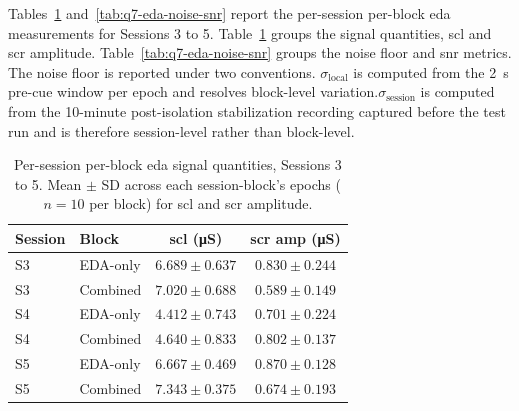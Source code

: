 Tables~\ref{tab:q7-eda-signal} and~\ref{tab:q7-eda-noise-snr} report the per-session per-block \gls{eda} measurements for Sessions 3 to 5. Table~\ref{tab:q7-eda-signal} groups the signal quantities, \gls{scl} and \gls{scr} amplitude. Table~\ref{tab:q7-eda-noise-snr} groups the noise floor and \gls{snr} metrics. The noise floor is reported under two conventions. $\sigma_{\text{local}}$ is computed from the \SI{2}{\second} pre-cue window per epoch and resolves block-level variation.$\sigma_{\text{session}}$ is computed from the 10-minute post-isolation stabilization recording captured before the test run and is therefore session-level rather than block-level.
\begin{table}[!htbp]
  \centering
  \caption{Per-session per-block \gls{eda} signal quantities, Sessions 3 to 5. Mean $\pm$ SD across each session-block's epochs ($n = \num{10}$ per block) for \gls{scl} and \gls{scr} amplitude.}
  \label{tab:q7-eda-signal}
  \begin{tabular}{l l c c}
    \toprule
    \textbf{Session} & \textbf{Block} & \textbf{\gls{scl} (\si{\micro\siemens})} & \textbf{\gls{scr} amp (\si{\micro\siemens})} \\
    \midrule
    S3 & EDA-only & $\num{6.689} \pm \num{0.637}$ & $\num{0.830} \pm \num{0.244}$ \\
    S3 & Combined & $\num{7.020} \pm \num{0.688}$ & $\num{0.589} \pm \num{0.149}$ \\
    \addlinespace
    S4 & EDA-only & $\num{4.412} \pm \num{0.743}$ & $\num{0.701} \pm \num{0.224}$ \\
    S4 & Combined & $\num{4.640} \pm \num{0.833}$ & $\num{0.802} \pm \num{0.137}$ \\
    \addlinespace
    S5 & EDA-only & $\num{6.667} \pm \num{0.469}$ & $\num{0.870} \pm \num{0.128}$ \\
    S5 & Combined & $\num{7.343} \pm \num{0.375}$ & $\num{0.674} \pm \num{0.193}$ \\
    \bottomrule
  \end{tabular}
\end{table}

